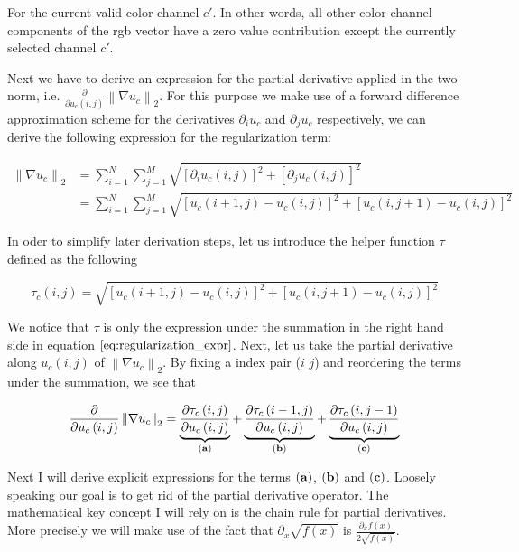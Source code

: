 \documentclass{paper}
\newcommand{\norm}[1]{\left\lVert#1\right\rVert}
\begin{document}
For the current valid color channel $c'$. In other words, all other color channel components of the rgb vector have a zero value contribution except the currently selected channel $c'$.

Next we have to derive an expression for the partial derivative applied in the two norm, i.e. $\frac{\partial}{\partial{u_{c} (i,j)}} \norm{\nabla u_c}_2$. For this purpose we make use of a forward difference approximation scheme for the derivatives $\partial_{i} u_c$ and $\partial_{j} u_c$ respectively, we can derive the following expression for the regularization term:

\begin{align}
	 \norm{\nabla{u_{c}}}_2 
	&= \sum_{i=1}^N \sum_{j=1}^M \sqrt{[\partial_{i} u_c(i,j)]^2 + [\partial_{j} u_c(i,j)]^2} \nonumber \\ 
	&= \sum_{i=1}^N \sum_{j=1}^M \sqrt{\left[ u_{c}\left(i+1, j\right) - u_{c}\left(i,j\right) \right]^2 + \left[ u_{c}\left(i, j+1 \right) - u_{c}\left(i,j\right) \right]^2}
\label{eq:regularization_expr}
\end{align}

In oder to simplify later derivation steps, let us introduce the helper function $\tau$ defined as the following 

\begin{equation}
	 \tau_{c}\left(i,j\right)
	= \sqrt{\left[ u_{c}\left(i+1, j\right) - u_{c}\left(i,j\right) \right]^2 + \left[ u_{c}\left(i, j+1 \right) - u_{c}\left(i,j\right) \right]^2}
\end{equation}

We notice that $\tau$ is only the expression under the summation in the right hand side in equation $\ref{eq:regularization_expr}$. Next, let us take the partial derivative along $u_{c}(i,j)$ of $\norm{\nabla{u_{c}}}_2$. By fixing a index pair ($i$ $j$) and reordering the terms under the summation, we see that 

\begin{equation}
	\frac{\partial}{\partial u_{c}\left(i,j\right)} \norm{\nabla{u_c}}_2 = \underbrace{\frac{\partial{\tau_{c}\left(i,j\right)}}{\partial u_{c}\left(i,j\right)}}_{\bf{(a)}} + \underbrace{\frac{\partial{\tau_{c}\left(i-1,j\right)}}{\partial u_{c}\left(i,j\right)}}_{\bf{(b)}} + \underbrace{\frac{\partial{\tau_{c}\left(i,j-1\right)}}{\partial u_{c}\left(i,j\right)}}_{\bf{(c)}}
\label{eq:abc_term}
\end{equation}

Next I will derive explicit expressions for the terms $\bf{(a)}$, $\bf{(b)}$ and $\bf{(c)}$. Loosely speaking our goal is to get rid of the partial derivative operator. The mathematical key concept I will rely on is the chain rule for partial derivatives. More precisely we will make use of the fact that $\partial_{x}\sqrt{f(x)}$ is $\frac{\partial_{x} f(x)}{2 \sqrt{f(x)}}$.
\end{document}
